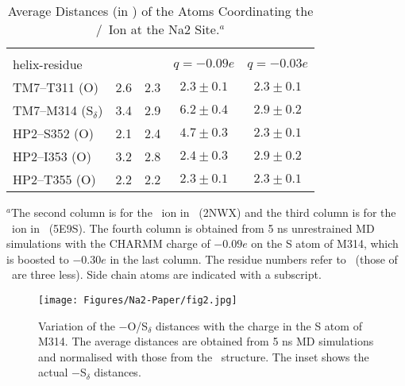 \begin{table}[t!]
\caption{\label{na2:tab1}Average Distances (in \angs) of the Atoms Coordinating the \Tl/\Na\ 
Ion at the Na2 Site.$^{a}$}
\begin{center}
\begin{tabular}{lcccc}
\hline
                         &                   &                   & \multicolumn{2}{c}{\Na} \\ \cline{4-5}
helix-residue            & \GltPh\ \Tl       & \GltTk\ \Na       & $q=-0.09e$    & $q=-0.03e$ \\ \hline
TM7--T311 (O)            & 2.6               & 2.3               & $2.3 \pm 0.1$ & $2.3 \pm 0.1$ \\
TM7--M314 (S$_{\delta}$) & 3.4               & 2.9               & $6.2 \pm 0.4$ & $2.9 \pm 0.2$ \\
HP2--S352 (O)            & 2.1               & 2.4               & $4.7 \pm 0.3$ & $2.3 \pm 0.1$ \\
HP2--I353 (O)            & 3.2               & 2.8               & $2.4 \pm 0.3$ & $2.9 \pm 0.2$ \\
HP2--T355 (O)            & 2.2               & 2.2               & $2.3 \pm 0.1$ & $2.3 \pm 0.1$ \\ \hline
\end{tabular}
\end{center}
\footnotesize $^{a}$The second column is for the \Tl\ ion in \GltPh\ (2NWX) and the third 
column is for the \Na\ ion in \GltTk\ (5E9S). The fourth column is obtained from 5 ns unrestrained 
MD simulations with the CHARMM charge of $-0.09e$ on the S atom of M314, which is boosted to 
$-0.30e$ in the last column. The residue numbers refer to \GltTk\ (those of \GltPh\ are three less). 
Side chain atoms are indicated with a subscript.
\end{table}

\begin{figure}[t!]
\centering
\texttt{[image: Figures/Na2-Paper/fig2.jpg]}
\caption{Variation of the \Na{}$-$O/S$_{\delta}$ distances with the charge in the 
         S atom of M314. The average distances are obtained from 5 ns MD simulations 
         and normalised with those from the \GltTk\ structure. The inset shows the 
         actual \Na{}$-$S$_{\delta}$ distances.}
\label{na2:fig2}
\end{figure}

